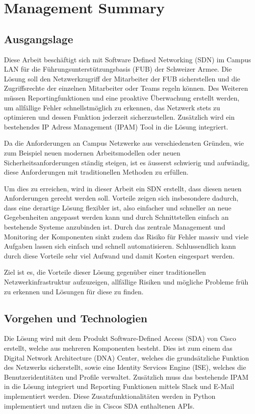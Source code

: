 \section{Management Summary}

\subsection{Ausgangslage}
Diese Arbeit beschäftigt sich mit Software Defined Networking (SDN) im Campus LAN für die Führungsunterstützungsbasis (FUB) der Schweizer Armee. Die Lösung soll den Netzwerkzugriff der Mitarbeiter der FUB sicherstellen und die Zugriffsrechte der einzelnen Mitarbeiter oder Teams regeln können. 
Des Weiteren müssen Reportingfunktionen und eine proaktive Überwachung erstellt werden, um allfällige Fehler schnellstmöglich zu erkennen, das Netzwerk stets zu optimieren und dessen Funktion jederzeit sicherzustellen.
Zusätzlich wird ein bestehendes IP Adress Management (IPAM) Tool in die Lösung integriert.

Da die Anforderungen an Campus Netzwerke aus verschiedensten Gründen, wie zum Beispiel neuen modernen Arbeitsmodellen oder neuen Sicherheitsanforderungen ständig steigen, ist es äusserst schwierig und aufwändig, diese Anforderungen mit traditionellen Methoden zu erfüllen. 

Um dies zu erreichen, wird in dieser Arbeit ein SDN erstellt, dass diesen neuen Anforderungen gerecht werden soll. Vorteile zeigen sich insbesondere dadurch, dass eine derartige Lösung flexibler ist, also einfacher und schneller an neue Gegebenheiten angepasst werden kann und durch Schnittstellen einfach an bestehende Systeme anzubinden ist. Durch das zentrale Management und Monitoring der Komponenten sinkt zudem das Risiko für Fehler massiv und viele Aufgaben lassen sich einfach und schnell automatisieren.
Schlussendlich kann durch diese Vorteile sehr viel Aufwand und damit Kosten eingespart werden.

Ziel ist es, die Vorteile dieser Lösung gegenüber einer traditionellen Netzwerkinfrastruktur aufzuzeigen, allfällige Risiken und mögliche Probleme früh zu erkennen und Lösungen für diese zu finden. 
\subsection{Vorgehen und Technologien}
Die Lösung wird mit dem Produkt Software-Defined Access (SDA) von Cisco erstellt, welche aus mehreren Komponenten besteht. Dies ist zum einem das Digital Network Architecture (DNA) Center, welches die grundsätzliche Funktion des Netzwerks sicherstellt, sowie eine Identity Services Engine (ISE), welches die Benutzeridentitäten und Profile verwaltet.
Zusätzlich muss das bestehende IPAM in die Lösung integriert und Reporting Funktionen mittels Slack und E-Mail implementiert werden. Diese Zusatzfunktionalitäten werden in Python implementiert und nutzen die in Ciscos SDA enthaltenen APIs.

